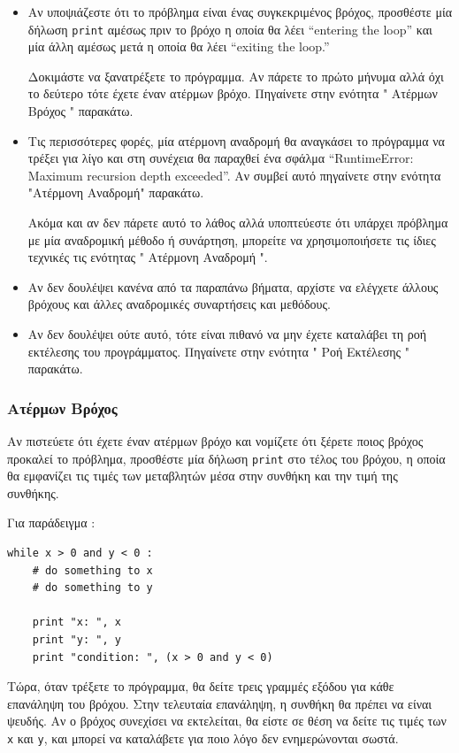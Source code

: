 \documentclass[10pt]{book}
\begin{document}
\begin{itemize}

\item Αν υποψιάζεστε ότι το πρόβλημα είναι ένας συγκεκριμένος βρόχος, προσθέστε 
μία δήλωση  {\tt print}  αμέσως πριν το βρόχο η οποία θα λέει  
``entering the loop''  και μία άλλη αμέσως μετά η οποία θα λέει  
``exiting the loop.''

 Δοκιμάστε να ξανατρέξετε το πρόγραμμα. Αν πάρετε το πρώτο μήνυμα αλλά όχι το 
δεύτερο τότε έχετε έναν ατέρμων βρόχο.  Πηγαίνετε στην ενότητα  " Ατέρμων Βρόχος "  παρακάτω.

\item Τις περισσότερες φορές, μία ατέρμονη αναδρομή θα αναγκάσει το πρόγραμμα να τρέξει για λίγο και στη συνέχεια θα παραχθεί ένα σφάλμα ``RuntimeError: Maximum recursion depth exceeded''. Αν συμβεί αυτό πηγαίνετε στην ενότητα "Ατέρμονη Αναδρομή" παρακάτω.

Ακόμα και αν δεν πάρετε αυτό το λάθος αλλά υποπτεύεστε ότι υπάρχει πρόβλημα με μία αναδρομική μέθοδο ή συνάρτηση, μπορείτε να χρησιμοποιήσετε τις ίδιες τεχνικές τις 
ενότητας  " Ατέρμονη Αναδρομή ". 

\item Αν δεν δουλέψει κανένα από τα παραπάνω βήματα, αρχίστε να ελέγχετε άλλους 
βρόχους και άλλες αναδρομικές συναρτήσεις και μεθόδους.

\item Αν δεν δουλέψει ούτε αυτό, τότε είναι πιθανό να μην έχετε καταλάβει τη ροή 
εκτέλεσης του προγράμματος.  Πηγαίνετε στην ενότητα  " Ροή Εκτέλεσης "  
παρακάτω.

\end{itemize}


\subsubsection{Ατέρμων Βρόχος}

Αν πιστεύετε ότι έχετε έναν ατέρμων βρόχο και νομίζετε ότι ξέρετε ποιος βρόχος προκαλεί το πρόβλημα, προσθέστε μία δήλωση  {\tt print}  στο τέλος του βρόχου, η οποία θα εμφανίζει τις τιμές των μεταβλητών μέσα στην συνθήκη και την τιμή της συνθήκης.

Για παράδειγμα :

\begin{verbatim}
while x > 0 and y < 0 :
    # do something to x
    # do something to y

    print "x: ", x
    print "y: ", y
    print "condition: ", (x > 0 and y < 0)
\end{verbatim}
%
 Τώρα, όταν τρέξετε το πρόγραμμα, θα δείτε τρεις γραμμές εξόδου για κάθε επανάληψη του βρόχου.  Στην τελευταία επανάληψη, η συνθήκη θα πρέπει να είναι ψευδής.  Αν ο βρόχος συνεχίσει να εκτελείται, θα είστε σε θέση να δείτε τις τιμές 
των  {\tt x}  και  {\tt y},  και μπορεί να καταλάβετε για ποιο λόγο δεν  ενημερώνονται σωστά.
\end{document}
